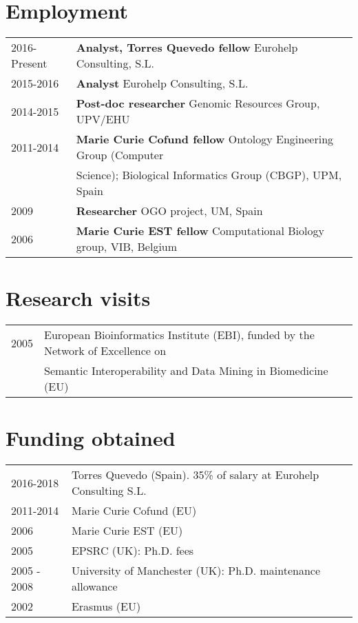 \documentclass[11pt,fullpage]{article}
\begin{document}
\section*{Employment}


\begin{tabular}{ll}
 2016-Present & {\bf Analyst, Torres Quevedo fellow} Eurohelp Consulting, S.L. \\
 2015-2016 & {\bf Analyst} Eurohelp Consulting, S.L. \\
 2014-2015 & {\bf Post-doc researcher} Genomic Resources Group, UPV/EHU  \\
 2011-2014 & {\bf Marie Curie Cofund fellow} Ontology Engineering Group (Computer \\ 
	    & Science); Biological Informatics Group (CBGP), UPM, Spain \\
 2009 & {\bf Researcher} OGO project, UM, Spain \\
 2006 & {\bf Marie Curie EST fellow} Computational Biology group, VIB, Belgium \\
\end{tabular}

\section*{Research visits}

\begin{tabular}{ll}
 2005 & European Bioinformatics Institute (EBI), funded by the Network of Excellence on \\ 
      & Semantic Interoperability and Data Mining in Biomedicine (EU)

\end{tabular}   

\section*{Funding obtained}

\begin{tabular}{ll}
        2016-2018 & Torres Quevedo (Spain). 35\% of salary at Eurohelp Consulting S.L. \\
	2011-2014 & Marie Curie Cofund (EU) \\
	2006 & Marie Curie EST (EU) \\
	2005 & EPSRC (UK): Ph.D. fees \\
	2005 - 2008 & University of Manchester (UK): Ph.D. maintenance allowance \\
	2002 & Erasmus (EU) \\
\end{tabular}
\end{document}
